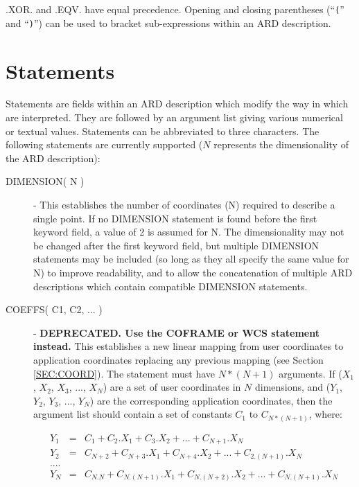 .XOR. and .EQV. have equal precedence. Opening and closing parentheses
(``\verb+(+'' and ``\verb+)+'') can be used to bracket sub-expressions within 
an ARD description. 

\section{\label{SEC:STAT}Statements}
Statements are fields within an ARD description which modify the way in
which  are interpreted. They are followed by
an argument list giving various numerical or textual values. Statements can be
abbreviated to three characters. The following statements are currently
supported ($N$ represents the dimensionality of the ARD description):

\begin{description}

\item [\label{ST:DIM}DIMENSION( N )] - This establishes the number of
coordinates (N) required to describe a single point. If no DIMENSION
statement is found before the first keyword field, a value of 2 is
assumed for N. The dimensionality may not be changed after the first
keyword field, but multiple DIMENSION statements may be included (so long
as they all specify the same value for N) to improve readability, and to
allow the concatenation of multiple ARD descriptions which contain
compatible DIMENSION statements.

\item [\label{ST:COE}COEFFS( C1, C2, ... )] - {\bf DEPRECATED. Use the COFRAME or WCS statement instead.} This establishes
a new linear mapping from user coordinates to application coordinates 
replacing any previous mapping (see Section \ref{SEC:COORD}). The
statement must have $N*(N+1)$ arguments. If ($X_{1}$, $X_{2}$, $X_{3}$, ...,
$X_{N}$) are a set of user coordinates in $N$ dimensions, and ($Y_{1}$,
$Y_{2}$, $Y_{3}$, ..., $Y_{N}$) are the corresponding application coordinates,
then the argument list should contain a set of constants $C_{1}$ to
$C_{N*(N+1)}$, where: 

\begin{eqnarray*}
Y_{1} & = & C_{1} + C_{2}.X_{1} + C_{3}.X_{2} + ... + C_{N+1}.X_{N} \\
Y_{2} & = & C_{N+2} + C_{N+3}.X_{1} + C_{N+4}.X_{2} + ... + C_{2.(N+1)}.X_{N} \\
 ....\\
Y_{N} & = & C_{N.N} + C_{N.(N+1)}.X_{1} + C_{N.(N+2)}.X_{2} + ... + C_{N.(N+1)}.X_{N} 
\end{eqnarray*}


\end{description}
